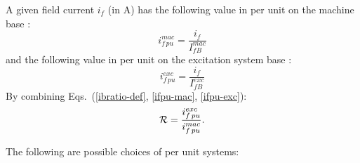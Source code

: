 A given field current $i_f$ (in A) has the following value in per unit on the machine base :
\begin{equation}\label{ifpu-mac}
i_{f\,pu}^{mac} = \frac{i_f}{I_{fB}^{mac}}
\end{equation}
and the following value in per unit on the excitation system base :
\begin{equation}\label{ifpu-exc}
i_{f\,pu}^{exc} = \frac{i_f}{I_{fB}^{exc}}
\end{equation}
By combining Eqs.~(\ref{ibratio-def}, \ref{ifpu-mac}, \ref{ifpu-exc}):
\begin{equation}\label{ibratio-pu}
{\cal R} = \frac{i_{f\,pu}^{exc}}{i_{f\,pu}^{mac}}.
\end{equation}

The following are possible choices of per unit systems:

